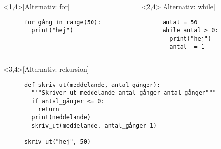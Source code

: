 \begin{frame}[fragile]
  \begin{columns}[t]
    \begin{column}{0.5\columnwidth}
  \begin{example}<1,4>[Alternativ: for]
    \begin{verbatim}
      for gång in range(50):
        print("hej")
    \end{verbatim}
  \end{example}
    \end{column}

    \begin{column}{0.5\columnwidth}
  \begin{example}<2,4>[Alternativ: while]
    \begin{verbatim}
      antal = 50
      while antal > 0:
        print("hej")
        antal -= 1
    \end{verbatim}
  \end{example}
    \end{column}
  \end{columns}

  \begin{example}<3,4>[Alternativ: rekursion]
    \begin{verbatim}
      def skriv_ut(meddelande, antal_gånger):
        """Skriver ut meddelande antal_gånger antal gånger"""
        if antal_gånger <= 0:
          return
        print(meddelande)
        skriv_ut(meddelande, antal_gånger-1)

      skriv_ut("hej", 50)
    \end{verbatim}
  \end{example}
\end{frame}

